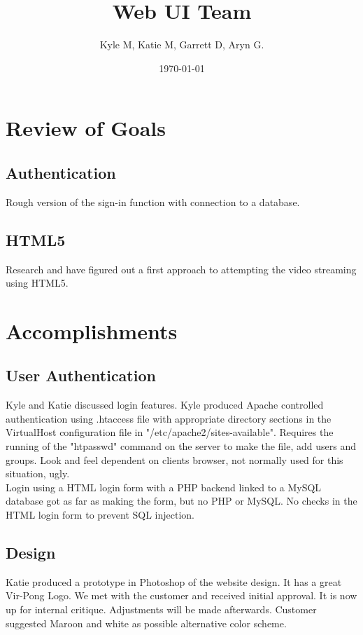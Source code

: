 




\title{Web UI Team}
\author{Kyle M, Katie M, Garrett D, Aryn G.}
\date{\today}
\maketitle


\section{Review of Goals}
	\subsection{Authentication}
	Rough version of the sign-in function with connection to a database.
	\subsection{HTML5}
	Research and have figured out a first
	approach to attempting the video streaming using HTML5.

\section{Accomplishments}
	\subsection{User Authentication}
	Kyle and Katie discussed login features. Kyle produced Apache controlled authentication using .htaccess file with appropriate directory sections in the VirtualHost configuration file in "/etc/apache2/sites-available". Requires the running of the "htpasswd" command on the server to make the file, add users and groups. Look and feel dependent on clients browser, not normally used for this situation, ugly.\\Login using a HTML login form with a PHP backend linked to a MySQL database got as far as making the form, but no PHP or MySQL. No checks in the HTML login form to prevent SQL injection.
	\subsection{Design}
	Katie produced a prototype in Photoshop of the website design. It has a great Vir-Pong Logo. We met with the customer and received initial approval. It is now up for internal critique. Adjustments will be made afterwards. Customer suggested Maroon and white as possible alternative color scheme.
